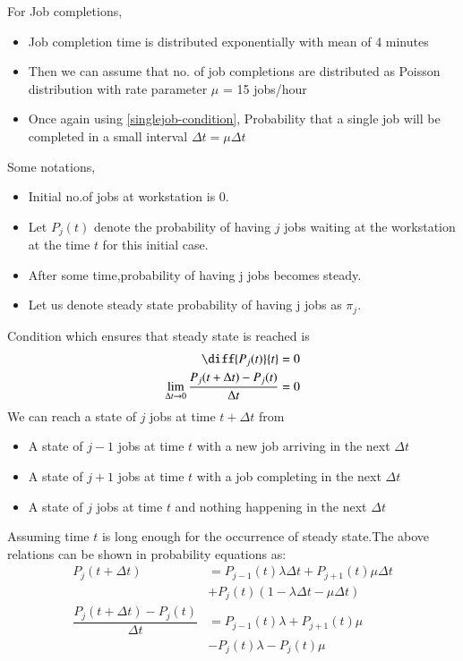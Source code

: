 \documentclass[journal,12pt,twocolumn]{IEEEtran}
\begin{document}
 For Job completions,
 \begin{itemize}
     \item  Job completion time is distributed exponentially with mean of 4 minutes 
     \item Then we can assume that no. of job completions are distributed as Poisson distribution with rate parameter $\mu$ = 15 jobs/hour
     \item Once again using \eqref{singlejob-condition},
 Probability that a single job will be completed in a small interval $\Delta t=\mu \Delta t$
 \end{itemize}
 Some notations,
 \begin{itemize}
     \item  Initial no.of jobs at workstation is 0.
     \item Let $P_{j}(t)$ denote the probability of having $j$ jobs waiting at the workstation at the time $t$ for this initial case.
     \item After some time,probability of having  j jobs becomes steady.
     \item Let us denote steady state probability of having j jobs as $\pi_j$.
 \end{itemize}
 Condition which ensures that steady state is reached is
 \begin{align}
     \diff{P_j(t)}{t}&=0\\
     \lim_{\Delta t\rightarrow 0}\dfrac{P_j(t+\Delta t)-P_j (t)}{\Delta t}&=0\label{steady-condition}
 \end{align}
  We can reach a state of $j$ jobs at time $t+\Delta t$ from
  \begin{itemize}
      \item A state of $j-1$ jobs at time $t$ with a new job arriving in the next $\Delta t$
      \item A state of $j+1$ jobs at time $t$ with a job completing in the next $\Delta t$
      \item A state of $j$ jobs at time $t$ and nothing happening in the next $\Delta t$
  \end{itemize}
 Assuming time  $t$ is long enough for the occurrence of steady state.The above relations can be shown in probability equations as:  
 \begin{align}
     P_j(t+\Delta t)&=P_{j-1}(t)\lambda\Delta t+ P_{j+1}(t)\mu \Delta t \nonumber\\&+P_j (t) (1-\lambda\Delta t -\mu \Delta t)\\
     \dfrac{P_j(t+\Delta t)-P_j (t)}{\Delta t}&= P_{j-1}(t)\lambda +P_{j+1}(t)\mu\nonumber\\& - P_j(t)\lambda -P_j(t)\mu
\end{align}
\end{document}
